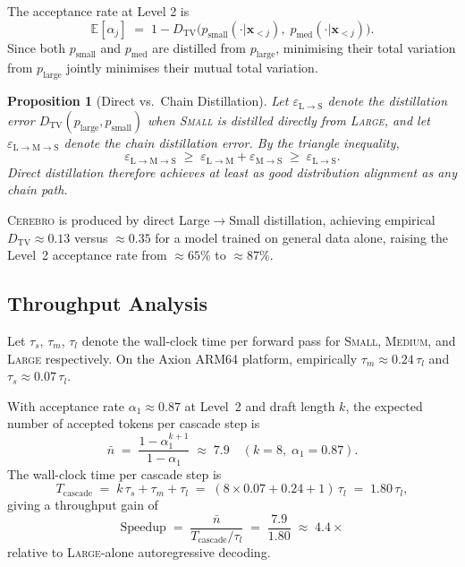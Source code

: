 \documentclass[11pt,a4paper]{article}
\newtheorem{proposition}{Proposition}
\newcommand{\cerebro}{\textsc{Cerebro}}
\newcommand{\dtv}{D_{\mathrm{TV}}}
\newcommand{\plarge}{p_{\mathrm{large}}}
\newcommand{\pmed}{p_{\mathrm{med}}}
\newcommand{\psmall}{p_{\mathrm{small}}}
\newcommand{\EE}{\mathbb{E}}
\begin{document}
The acceptance rate at Level 2 is
\[
  \EE[\alpha_j] \;=\; 1 - \dtv\!\bigl(\psmall(\cdot|\mathbf{x}_{<j}),\;
                                       \pmed(\cdot|\mathbf{x}_{<j})\bigr).
\]
Since both $\psmall$ and $\pmed$ are distilled from $\plarge$, minimising their
total variation from $\plarge$ jointly minimises their mutual total variation.

\begin{proposition}[Direct vs.\ Chain Distillation]
\label{prop:direct}
Let $\varepsilon_{\mathrm{L}\to\mathrm{S}}$ denote the distillation error
$\dtv(\plarge, \psmall)$ when \textsc{Small} is distilled directly from
\textsc{Large}, and let $\varepsilon_{\mathrm{L}\to\mathrm{M}\to\mathrm{S}}$
denote the chain distillation error. By the triangle inequality,
\[
  \varepsilon_{\mathrm{L}\to\mathrm{M}\to\mathrm{S}} \;\ge\;
  \varepsilon_{\mathrm{L}\to\mathrm{M}} + \varepsilon_{\mathrm{M}\to\mathrm{S}}
  \;\ge\; \varepsilon_{\mathrm{L}\to\mathrm{S}}.
\]
Direct distillation therefore achieves at least as good distribution alignment
as any chain path.
\end{proposition}

\cerebro{} is produced by direct Large$\to$Small distillation, achieving
empirical $\dtv \approx 0.13$ versus $\approx 0.35$ for a model trained on
general data alone, raising the Level~2 acceptance rate from $\approx 65\%$ to
$\approx 87\%$.

\subsection{Throughput Analysis}
\label{sec:throughput}

Let $\tau_s$, $\tau_m$, $\tau_l$ denote the wall-clock time per forward pass
for \textsc{Small}, \textsc{Medium}, and \textsc{Large} respectively. On the
Axion ARM64 platform, empirically $\tau_m \approx 0.24\,\tau_l$ and
$\tau_s \approx 0.07\,\tau_l$.

With acceptance rate $\alpha_1 \approx 0.87$ at Level~2 and draft length $k$,
the expected number of accepted tokens per cascade step is
\[
  \bar{n} \;=\; \frac{1 - \alpha_1^{k+1}}{1 - \alpha_1}
  \;\approx\; 7.9 \quad (k=8,\;\alpha_1=0.87).
\]
The wall-clock time per cascade step is
\[
  T_{\mathrm{cascade}} \;=\; k\,\tau_s + \tau_m + \tau_l
  \;=\; (8 \times 0.07 + 0.24 + 1)\,\tau_l
  \;=\; 1.80\,\tau_l,
\]
giving a throughput gain of
\[
  \text{Speedup} \;=\; \frac{\bar{n}}{T_{\mathrm{cascade}} / \tau_l}
  \;=\; \frac{7.9}{1.80} \;\approx\; 4.4\times
\]
relative to \textsc{Large}-alone autoregressive decoding.
\end{document}
